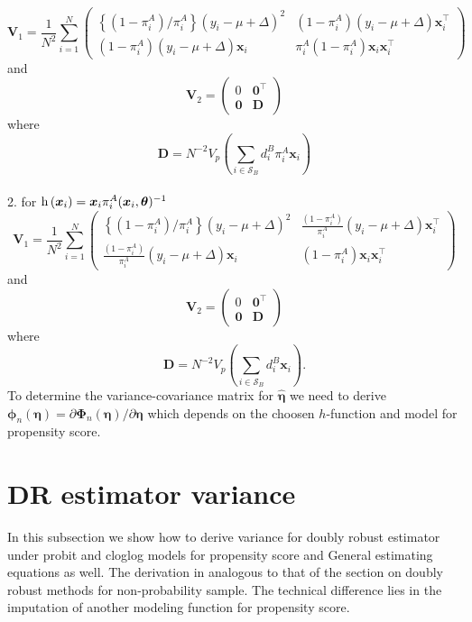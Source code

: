 \documentclass[
  letterpaper,
  DIV=11,
  numbers=noendperiod]{scrreprt}
\begin{document}
\[
\mathbf{V}_1=\frac{1}{N^2} \sum_{i=1}^N\left(\begin{array}{cc}
\left\{\left(1-\pi_i^A\right) / \pi_i^A\right\}\left(y_i-\mu+\Delta\right)^2 & \left(1-\pi_i^A\right)\left(y_i-\mu+\Delta\right) \boldsymbol{x}_i^{\top} \\
\left(1-\pi_i^A\right)\left(y_i-\mu+\Delta\right) \boldsymbol{x}_i & \pi_i^A\left(1-\pi_i^A\right) \boldsymbol{x}_i \boldsymbol{x}_i^{\top}
\end{array}\right)
\] and \[
\mathbf{V}_2=\left(\begin{array}{cc}
0 & \mathbf{0}^{\top} \\
\mathbf{0} & \mathbf{D}
\end{array}\right)
\] where
\[\mathbf{D}=N^{-2} V_p\left(\sum_{i \in \mathcal{S}_B} d_i^B \pi_i^A \boldsymbol{x}_i\right)\]\\
2. for
\(\operatorname{h}\left(\boldsymbol{x}_i\right) = \boldsymbol{x}_i \pi_i^A(\boldsymbol{x}_i, \boldsymbol{\theta}) ^{-1}\)
\[
\mathbf{V}_1=\frac{1}{N^2} \sum_{i=1}^N\left(\begin{array}{cc}
\left\{\left(1-\pi_i^A\right) / \pi_i^A\right\}\left(y_i-\mu+\Delta\right)^2 & \frac{\left(1-\pi_i^A\right)}{\pi_i^A}\left(y_i-\mu+\Delta\right) \boldsymbol{x}_i^{\top} \\
\frac{\left(1-\pi_i^A\right)}{\pi_i^A}\left(y_i-\mu+\Delta\right) \boldsymbol{x}_i & \left(1-\pi_i^A\right) \boldsymbol{x}_i \boldsymbol{x}_i^{\top}
\end{array}\right)
\] and \[
\mathbf{V}_2=\left(\begin{array}{cc}
0 & \mathbf{0}^{\top} \\
\mathbf{0} & \mathbf{D}
\end{array}\right)
\] where
\[\mathbf{D}=N^{-2} V_p\left(\sum_{i \in \mathcal{S}_B} d_i^B \boldsymbol{x}_i\right).\]
To determine the variance-covariance matrix for
\(\hat{\boldsymbol{\eta}}\) we need to derive
\(\boldsymbol{\phi}_n(\boldsymbol{\eta})=\partial \boldsymbol{\Phi}_n(\boldsymbol{\eta}) / \partial \boldsymbol{\eta}\)
which depends on the choosen \(h\)-function and model for propensity
score.

\section{DR estimator variance}\label{dr-estimator-variance}

In this subsection we show how to derive variance for doubly robust
estimator under probit and cloglog models for propensity score and
General estimating equations as well. The derivation in analogous to
that of the section on doubly robust methods for non-probability sample.
The technical difference lies in the imputation of another modeling
function for propensity score.
\end{document}

